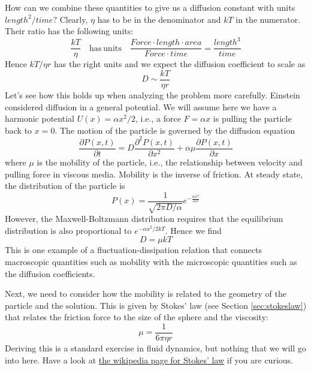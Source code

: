 How can we combine these quantities to give us a diffusion constant with units $length^2/time$?
Clearly, $\eta$ has to be in the denominator and $kT$ in the numerator. Their ratio has the following units:
\begin{equation}
\frac{kT}{\eta}\quad \mathrm{has\ units}\quad \frac{Force\cdot length\cdot area}{Force \cdot time} = \frac{length^3}{time}
\end{equation}
Hence $kT/\eta r$ has the right units and we expect the diffusion coefficient to scale as
\begin{equation}
D \sim \frac{kT}{\eta r}
\end{equation}
Let's see how this holds up when analyzing the problem more carefully.
Einstein considered diffusion in a general potential. We will assume here we have a harmonic potential $U(x) = \alpha x^2/2$, i.e., a force $F = \alpha x$ is pulling the particle back to $x=0$.
The motion of the particle is governed by the diffusion equation
\begin{equation}
\frac{\partial P(x,t)}{\partial t} = D \frac{\partial^2 P(x,t)}{\partial x^2} + \alpha \mu \frac{\partial P(x,t)}{\partial x}
\end{equation}
where $\mu$ is the mobility of the particle, i.e., the relationship between velocity and pulling force in viscous media. Mobility is the inverse of friction.
At steady state, the distribution of the particle is
\begin{equation}
P(x) = \frac{1}{\sqrt{2\pi D/\alpha}}e^{ - \frac{\alpha x^2}{2D}}
\end{equation}
However, the Maxwell-Boltzmann distribution requires that the equilibrium distribution is also proportional to $e^{-\alpha x^2/2kT}$. Hence we find
\begin{equation}
D = \mu kT
\end{equation}
This is one example of a fluctuation-dissipation relation that connects macroscopic quantities such as mobility with the microscopic quantities such as the diffusion coefficients.

Next, we need to consider how the mobility is related to the geometry of the particle and the solution.
This is given by Stokes' law (see Section \ref{sec:stokeslaw}) that relates the friction force to the size of the sphere and the viscosity:
\begin{equation}
\mu = \frac{1}{6\pi \eta r}
\end{equation}
Deriving this is a standard exercise in fluid dynamics, but nothing that we will go into here. Have a look at \href{https://en.wikipedia.org/wiki/Stokes%27_law}{the wikipedia page for Stokes' law} if you are curious.

